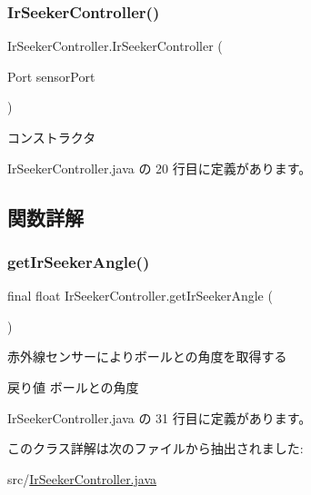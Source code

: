 \subsubsection{\texorpdfstring{IrSeekerController()}{IrSeekerController()}}
{\footnotesize\ttfamily Ir\+Seeker\+Controller.\+Ir\+Seeker\+Controller (\begin{DoxyParamCaption}\item[{Port}]{sensor\+Port }\end{DoxyParamCaption})\hspace{0.3cm}{\ttfamily [inline]}}

コンストラクタ 

 Ir\+Seeker\+Controller.\+java の 20 行目に定義があります。



\subsection{関数詳解}
\mbox{\label{class_ir_seeker_controller_a71fb9a9096eebd286ef0f02c6f603468}} 
\subsubsection{\texorpdfstring{getIrSeekerAngle()}{getIrSeekerAngle()}}
{\footnotesize\ttfamily final float Ir\+Seeker\+Controller.\+get\+Ir\+Seeker\+Angle (\begin{DoxyParamCaption}{ }\end{DoxyParamCaption})\hspace{0.3cm}{\ttfamily [inline]}}

赤外線センサーによりボールとの角度を取得する \begin{DoxyReturn}{戻り値}
ボールとの角度 
\end{DoxyReturn}


 Ir\+Seeker\+Controller.\+java の 31 行目に定義があります。



このクラス詳解は次のファイルから抽出されました\+:\begin{DoxyCompactItemize}
\item 
src/\mbox{\hyperlink{_ir_seeker_controller_8java}{Ir\+Seeker\+Controller.\+java}}\end{DoxyCompactItemize}
